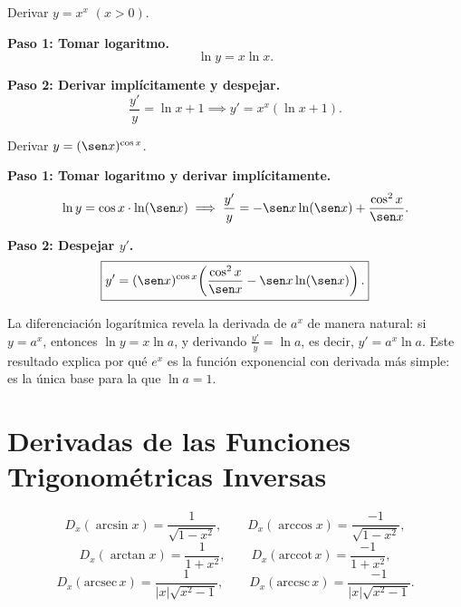 \begin{example}[Derivación logarítmica: $y = x^x$]
Derivar $y = x^x$ \quad $(x>0)$.

\begin{myproof}

\textbf{Paso 1: Tomar logaritmo.}
\[
\ln y = x\ln x.
\]

\textbf{Paso 2: Derivar implícitamente y despejar.}
\[
\frac{y'}{y} = \ln x + 1 \implies
\boxed{y' = x^x(\ln x+1).}
\]
\end{myproof}
\end{example}

\begin{example}[Derivación logarítmica: $y = (\sen x)^{\cos x}$]
Derivar $y = (\sen x)^{\cos x}$.

\begin{myproof}

\textbf{Paso 1: Tomar logaritmo y derivar implícitamente.}
\[
\ln y = \cos x\cdot\ln(\sen x) \implies
\frac{y'}{y} = -\sen x\ln(\sen x)+\frac{\cos^2 x}{\sen x}.
\]

\textbf{Paso 2: Despejar $y'$.}
\[
\boxed{y' = (\sen x)^{\cos x}\!\left(\frac{\cos^2 x}{\sen x}
-\sen x\ln(\sen x)\right).}
\]
\end{myproof}
\end{example}

\begin{rem} La diferenciación logarítmica revela la derivada de $a^x$ de manera natural: si $y=a^x$, entonces $\ln y = x\ln a$, y derivando
$\frac{y'}{y}=\ln a$, es decir, $y'=a^x\ln a$. Este resultado explica por qué $e^x$ es la función exponencial con derivada más simple: es la única base para la que $\ln a = 1$.
\end{rem}



\section{Derivadas de las Funciones Trigonométricas Inversas}

\begin{theorem}
\[
D_x(\arcsin x) = \frac{1}{\sqrt{1-x^2}}, \qquad
D_x(\arccos x) = \frac{-1}{\sqrt{1-x^2}},
\]
\[
D_x(\arctan x) = \frac{1}{1+x^2}, \qquad
D_x(\text{arccot}\, x) = \frac{-1}{1+x^2},
\]
\[
D_x(\text{arcsec}\, x) = \frac{1}{|x|\sqrt{x^2-1}}, \qquad
D_x(\text{arccsc}\, x) = \frac{-1}{|x|\sqrt{x^2-1}}.
\]
\end{theorem}

